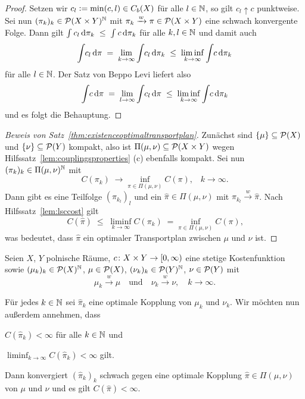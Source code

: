 \documentclass[../main/main.tex]{subfiles}
\begin{document}
	\begin{proof}
		Setzen wir $c_l \vcentcolon = \min(c, l) \in C_b(X)$ für alle $l \in \mathbb{N}$, so gilt $c_l \uparrow c$ punktweise. Sei nun $(\pi_k)_k \in \mathcal{P}(X \times Y)^{\mathbb{N}}$ mit $\pi_k \xrightarrow{w} \pi \in \mathcal{P}(X \times Y)$ eine schwach konvergente Folge. Dann gilt
		$\int_{} \, c_l \, \mathrm{d}\pi_k \; \leq \; \int_{} \, c \, \mathrm{d}\pi_k$ für alle $k, l \in \mathbb{N}$ und damit auch 
		\[ \int_{} \, c_l \, \mathrm{d}\pi \; = \; \lim_{k \to \infty} \int_{} \, c_l \, \mathrm{d}\pi_k \; \leq \; \liminf_{k \to \infty} \int_{} \, c \, \mathrm{d}\pi_k \]
		für alle $l \in \mathbb{N}$. Der Satz von Beppo Levi liefert also
		\[ \int_{} \, c \, \mathrm{d}\pi \; = \; \lim_{l \to \infty} \int_{} \, c_l \, \mathrm{d}\pi \; \leq \; \liminf_{k \to \infty} \int_{} \, c \, \mathrm{d}\pi_k \]
		und es folgt die Behauptung.
	\end{proof}

	\begin{proof}[Beweis von Satz~\ref{thm:existenceoptimaltransportplan}]
		Zunächst sind $\left\{\mu\right\} \subseteq \mathcal{P}(X)$ und $\left\{\nu\right\} \subseteq \mathcal{P}(Y)$ kompakt, also ist $\Pi(\mu, \nu) \subseteq \mathcal{P}(X \times Y)$ 
		wegen Hilfssatz~\ref{lem:couplingsproperties} (c) ebenfalls kompakt.
		Sei nun $(\pi_k)_k \in \Pi(\mu, \nu)^{\mathbb{N}}$ mit
		\[ C(\pi_k) \; \to \inf_{\pi \in \Pi(\mu, \nu)} C(\pi) \text{,} \quad k \to \infty \text{.} \]
		Dann gibt es eine Teilfolge $(\pi_{k_l})_l$ und ein $\hat{\pi} \in \Pi(\mu, \nu)$ mit $\pi_{k_l} \xrightarrow{w} \hat{\pi}$. Nach Hilfssatz~\ref{lem:lsccost} gilt
		\[ C(\hat{\pi}) \; \leq \; \liminf_{k \to \infty} C(\pi_k) \; = \inf_{\pi \in \Pi(\mu, \nu)} C(\pi) \text{,} \]
		was bedeutet, dass $\hat{\pi}$ ein optimaler Transportplan zwischen $\mu$ und $\nu$ ist. 
	\end{proof}

	\begin{Satz}
		\label{thm:optimalseqremainsoptimal}
		Seien $X$, $Y$ polnische Räume, $c \colon X \times Y \to [0, \infty)$ eine stetige Kostenfunktion sowie $(\mu_k)_k \in \mathcal{P}(X)^{\mathbb{N}}$, $\mu \in \mathcal{P}(X)$, 
		$(\nu_k)_k \in \mathcal{P}(Y)^{\mathbb{N}}$, $\nu \in \mathcal{P}(Y)$ mit
		\[ \mu_k \xrightarrow{w} \mu \quad \text{und} \quad \nu_k \xrightarrow{w} \nu, \quad k \to \infty \text{.} \]
		
		Für jedes $k \in \mathbb{N}$ sei $\hat{\pi}_k$ eine optimale Kopplung von $\mu_k$ und $\nu_k$. 
		Wir möchten nun außerdem annehmen, dass
		\begin{itemizethm}
			\item $C(\hat{\pi}_k) < \infty$ für alle $k \in \mathbb{N}$ und
			\item $\liminf_{k \to \infty} C(\hat{\pi}_k) < \infty$ gilt.
		\end{itemizethm}
		Dann konvergiert $(\hat{\pi}_k)_k$ schwach gegen eine optimale Kopplung $\hat{\pi} \in \Pi(\mu, \nu)$ von $\mu$ und $\nu$ und es gilt $C(\hat{\pi}) < \infty$. 
	\end{Satz}
\end{document}
